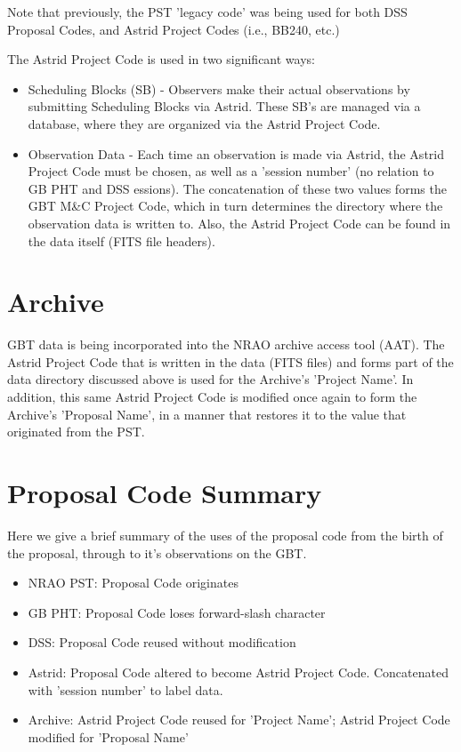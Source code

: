 \documentclass{article}
\begin{document}
Note that previously, the PST 'legacy code' was being used for both DSS Proposal Codes, and Astrid Project Codes (i.e., BB240, etc.)

The Astrid Project Code is used in two significant ways:

\begin{itemize}
\item Scheduling Blocks (SB) - Observers make their actual observations by
submitting Scheduling Blocks via Astrid.  These SB's are managed via a
database, where they are organized via the Astrid Project Code.
\item Observation Data - Each time an observation is made via Astrid, the
Astrid Project Code must be chosen, as well as a 'session number' (no relation
to GB PHT and DSS essions).  The concatenation of these two values forms the
GBT M\&C Project Code, which in turn determines the directory where the
observation data is written to.  Also, the Astrid Project Code can be found in the data itself (FITS file headers).
\end{itemize}

\section{Archive}\label{archive_sec}

GBT data is being incorporated into the NRAO archive access tool (AAT).  The Astrid Project Code that is written in the data (FITS files) and forms part of the data directory discussed above is used for the Archive's 'Project Name'.  In addition, this same Astrid Project Code is  modified once again to form the Archive's 'Proposal Name', in a manner that restores it to the value that originated from the PST.    

\section{Proposal Code Summary}\label{pcode_summary_sec}

Here we give a brief summary of the uses of the proposal code from the birth
of the proposal, through to it's observations on the GBT.
\begin{itemize}
\item NRAO PST: Proposal Code originates
\item GB PHT: Proposal Code loses forward-slash character
\item DSS: Proposal Code reused without modification
\item Astrid: Proposal Code altered to become Astrid Project Code.
Concatenated with 'session number' to label data.
\item Archive: Astrid Project Code reused for 'Project Name';  Astrid Project Code modified for 'Proposal Name'
\end{itemize}
\end{document}

